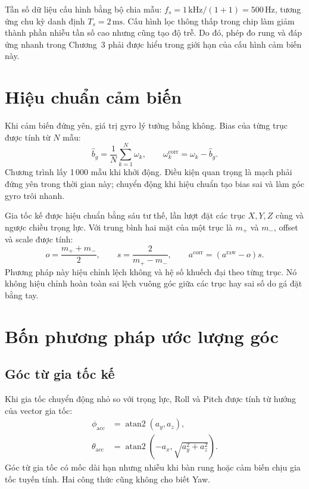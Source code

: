 \documentclass[14pt,a4paper,oneside]{extreport}
\newcommand{\unit}[1]{\,\mathrm{#1}}
\begin{document}
Tần số dữ liệu cấu hình bằng bộ chia mẫu: $f_s=1\unit{kHz}/(1+1)=500\unit{Hz}$, tương ứng chu kỳ danh định $T_s=2\unit{ms}$. Cấu hình lọc thông thấp trong chip làm giảm thành phần nhiễu tần số cao nhưng cũng tạo độ trễ. Do đó, phép đo rung và đáp ứng nhanh trong Chương~3 phải được hiểu trong giới hạn của cấu hình cảm biến này.

\section{Hiệu chuẩn cảm biến}
Khi cảm biến đứng yên, giá trị gyro lý tưởng bằng không. Bias của từng trục được tính từ $N$ mẫu:
\begin{equation}\label{eq:gyro_bias}
\hat b_g=\frac{1}{N}\sum_{k=1}^{N}\omega_k,\qquad
\omega_k^{\mathrm{corr}}=\omega_k-\hat b_g.
\end{equation}
Chương trình lấy 1\,000 mẫu khi khởi động. Điều kiện quan trọng là mạch phải đứng yên trong thời gian này; chuyển động khi hiệu chuẩn tạo bias sai và làm góc gyro trôi nhanh.

Gia tốc kế được hiệu chuẩn bằng sáu tư thế, lần lượt đặt các trục $X,Y,Z$ cùng và ngược chiều trọng lực. Với trung bình hai mặt của một trục là $m_+$ và $m_-$, offset và scale được tính:
\begin{equation}\label{eq:acc_cal}
o=\frac{m_++m_-}{2},\qquad s=\frac{2}{m_+-m_-},\qquad a^{\mathrm{corr}}=(a^{\mathrm{raw}}-o)s.
\end{equation}
Phương pháp này hiệu chỉnh lệch không và hệ số khuếch đại theo từng trục. Nó không hiệu chỉnh hoàn toàn sai lệch vuông góc giữa các trục hay sai số do gá đặt bằng tay.

\section{Bốn phương pháp ước lượng góc}
\subsection{Góc từ gia tốc kế}
Khi gia tốc chuyển động nhỏ so với trọng lực, Roll và Pitch được tính từ hướng của vector gia tốc:
\begin{align}
\phi_{\mathrm{acc}}&=\operatorname{atan2}(a_y,a_z),\label{eq:roll_acc}\\
\theta_{\mathrm{acc}}&=\operatorname{atan2}\!\left(-a_x,\sqrt{a_y^2+a_z^2}\right).\label{eq:pitch_acc}
\end{align}
Góc từ gia tốc có mốc dài hạn nhưng nhiễu khi bàn rung hoặc cảm biến chịu gia tốc tuyến tính. Hai công thức cũng không cho biết Yaw.
\end{document}
